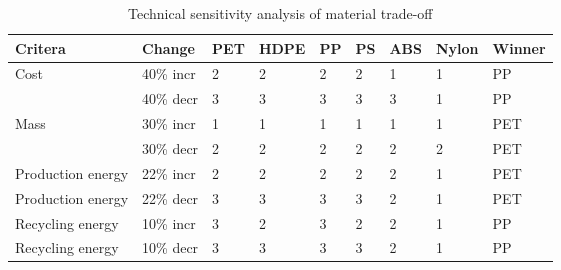 \begin{table}[h]
\centering
\caption{Technical sensitivity analysis of material trade-off}
\label{tab:techsens}
\begin{scriptsize}

\begin{tabular}{|l|l|l|l|l|l|l|l|l|}
\hline
\textbf{Critera}  & \textbf{Change} & \textbf{PET}              & \textbf{HDPE}             & \textbf{PP}               & \textbf{PS}               & \textbf{ABS}              & \textbf{Nylon}            & \textbf{Winner} \\ \hline
Cost              & 40\% incr       & \cellcolor[HTML]{FCE4D6}2 & 2                         & 2                         & 2                         & \cellcolor[HTML]{FCE4D6}1 & 1                         & PP              \\ \cline{2-9}
                  & 40\% decr       & \cellcolor[HTML]{FCE4D6}3 & \cellcolor[HTML]{FCE4D6}3 & \cellcolor[HTML]{FCE4D6}3 & \cellcolor[HTML]{FCE4D6}3 & \cellcolor[HTML]{FCE4D6}3 & 1                         & PP              \\ \hline
Mass              & 30\% incr       & 1                         & 1                         & \cellcolor[HTML]{FCE4D6}1 & \cellcolor[HTML]{FCE4D6}1 & \cellcolor[HTML]{FCE4D6}1 & 1                         & PET             \\ \cline{2-9}
                  & 30\% decr       & \cellcolor[HTML]{FCE4D6}2 & \cellcolor[HTML]{FCE4D6}2 & 2                         & 2                         & 2                         & \cellcolor[HTML]{FCE4D6}2 & PET             \\ \hline
Production energy & 22\% incr       & 2                         & 2                         & \cellcolor[HTML]{FCE4D6}2 & 2                         & 2                         & 1                         & PET             \\ \hline
Production energy & 22\%   decr     & \cellcolor[HTML]{FCE4D6}3 & \cellcolor[HTML]{FCE4D6}3 & 3                         & \cellcolor[HTML]{FCE4D6}3 & \cellcolor[HTML]{FCE4D6}2 & 1                         & PET             \\ \hline
Recycling energy  & 10\%   incr     & 3                         & \cellcolor[HTML]{FCE4D6}2 & 3                         & 2                         & 2                         & 1                         & PP              \\ \hline
Recycling energy  & 10\%   decr     & 3                         & 3                         & 3                         & \cellcolor[HTML]{FCE4D6}3 & 2                         & 1                         & PP              \\ \hline
\end{tabular}%


\end{scriptsize}
\end{table}




